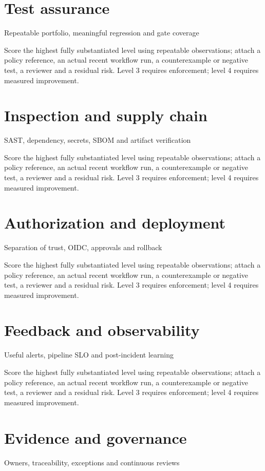 \documentclass[11pt,letterpaper]{article}
\begin{document}
\section{Test assurance}
Repeatable portfolio, meaningful regression and gate coverage

Score the highest fully substantiated level using repeatable observations; attach a policy reference, an actual recent workflow run, a counterexample or negative test, a reviewer and a residual risk. Level 3 requires enforcement; level 4 requires measured improvement.

\section{Inspection and supply chain}
SAST, dependency, secrets, SBOM and artifact verification

Score the highest fully substantiated level using repeatable observations; attach a policy reference, an actual recent workflow run, a counterexample or negative test, a reviewer and a residual risk. Level 3 requires enforcement; level 4 requires measured improvement.

\section{Authorization and deployment}
Separation of trust, OIDC, approvals and rollback

Score the highest fully substantiated level using repeatable observations; attach a policy reference, an actual recent workflow run, a counterexample or negative test, a reviewer and a residual risk. Level 3 requires enforcement; level 4 requires measured improvement.

\section{Feedback and observability}
Useful alerts, pipeline SLO and post-incident learning

Score the highest fully substantiated level using repeatable observations; attach a policy reference, an actual recent workflow run, a counterexample or negative test, a reviewer and a residual risk. Level 3 requires enforcement; level 4 requires measured improvement.

\section{Evidence and governance}
Owners, traceability, exceptions and continuous reviews
\end{document}
